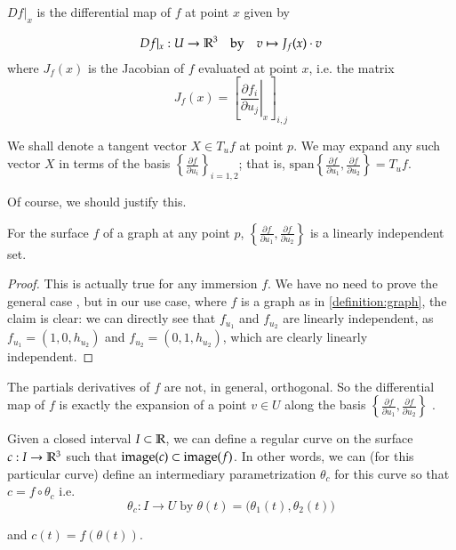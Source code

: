     \begin{defn} \label{definition:differential-map}
       	$Df\vert_x$ is the differential map of $f$ at point $x$ given by
    
    \[
     Df|_x : U \to \mathbb{R}^3 \quad \textrm{by} \quad v \mapsto J_f (x) \cdot v
    \]
where  $J_f(x)$ is the Jacobian of $f$ evaluated at point $x$, i.e. the matrix
\[
J_f (x) = \left[ \left.\frac{\partial f_i}{\partial u_j}\right\vert_x \right]_{i,j}
\]
\end{defn}
We shall denote a tangent vector $X \in T_u f$ at point $p$. We may expand any such vector $X$ in terms of the basis $\left\{ \frac{\partial f}{\partial u_i}\right\}_{i=1,2}$; that is,
$\textrm{span}\left\{ \frac{\partial f}{\partial u_1}, \frac{\partial f}{\partial u_2}\right\} = T_u f$. 

Of course, we should justify this.  
\begin{lemma} \label{lemma:f_ui-is-a-basis}
  	For the surface $f$ of a graph at any point $p$, $\left\{\frac{\partial f}{\partial u_1} , \frac{\partial f}{\partial u_2}\right\}$ is a linearly independent set.
\end{lemma}
\begin{proof}
This is actually true for any immersion $f$. We have no need to prove the general case , but
in our use case, where $f$ is a graph as in \cref{definition:graph}, the claim is clear: we can directly see that $f_{u_1}$ and $f_{u_2}$ are linearly independent, as $f_{u_1} = (1,0,h_{u_2})$ and $f_{u_2} = (0,1,h_{u_2})$, which are clearly linearly independent. \end{proof}
	The partials derivatives of $f$ are not, in general, orthogonal.
  	So the differential map of $f$ is exactly the expansion of
  	a point  $v \in U$ along the basis
  	$\left\{\frac{\partial f}{\partial u_1} , \frac{\partial f}{\partial u_2}\right\}$ .

  	
  	\begin{defn} \label{definition:curve-on-a-surface}
Given a closed interval $I \subset \mathbb{R}$, we can define a regular curve on the surface
$c: I \to \mathbb{R}^3$ such that $\mathrm{image}(c) \subset \mathrm{image}(f)$. In other words, we can (for this particular curve) define an intermediary parametrization $\theta_c$ for this curve so that
  $ c = f \circ \theta_c $ i.e.
\[
\theta_c : I \to U \; \textrm{by} \; \theta(t) = \big(\theta_1(t), \theta_2(t)\big)
\]

and $c(t) = f(\theta(t))$.
\end{defn}

